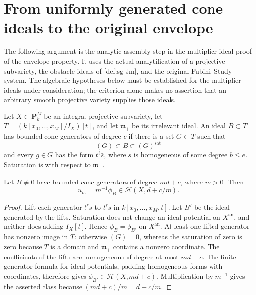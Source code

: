 \section{From uniformly generated cone ideals to the original envelope}

The following argument is the analytic assembly step in the multiplier-ideal
proof of the envelope property.  It uses the actual analytification of a
projective subvariety, the obstacle ideals of
\cref{def:sg-Jm}, and the original Fubini--Study system.  The algebraic
hypotheses below must be established for the multiplier ideals under
consideration; the criterion alone makes no assertion that an arbitrary
smooth projective variety supplies those ideals.

\begin{definition}
\label{def:c0n-bounded-cone-generators}
\leanok
Let $X\subset\mathbf P^M_k$ be an integral projective subvariety, let
$T=(k[x_0,\ldots,x_M]/I_X)[t]$, and let $\mathfrak m_+$ be its irrelevant
ideal.  An ideal $B\subset T$ has bounded cone generators of degree $e$ if
there is a set $G\subset T$ such that
\[
 (G)\subset B\subset (G)^{\mathrm{sat}}
\]
and every $g\in G$ has the form $t^\ell\bar s$, where $s$ is homogeneous of
some degree $b\le e$.  Saturation is with respect to $\mathfrak m_+$.
\end{definition}

\begin{lemma}
\label{lem:c0n-bounded-cone-fs}
\leanok
Let $B\ne0$ have bounded cone generators of degree $md+c$, where $m>0$.
Then
\[
 u_m=m^{-1}\phi_B\in\mathcal H(X,d+c/m).
\]
\end{lemma}
\begin{proof}
Lift each generator $t^\ell\bar s$ to $t^\ell s$ in
$k[x_0,\ldots,x_M,t]$.  Let $B'$ be the ideal generated by the lifts.
Saturation does not change an ideal potential on $X^{\mathrm{an}}$, and
neither does adding $I_X[t]$.  Hence $\phi_B=\phi_{B'}$ on
$X^{\mathrm{an}}$.  At least one lifted generator has nonzero image in $T$:
otherwise $(G)=0$, whereas the saturation of zero is zero because $T$ is a
domain and $\mathfrak m_+$ contains a nonzero coordinate.  The coefficients
of the lifts are homogeneous of degree at most $md+c$.  The finite-generator
formula for ideal potentials, padding homogeneous forms with coordinates,
therefore gives $\phi_{B'}\in\mathcal H(X,md+c)$.  Multiplication by $m^{-1}$
gives the asserted class because $(md+c)/m=d+c/m$.
\end{proof}

